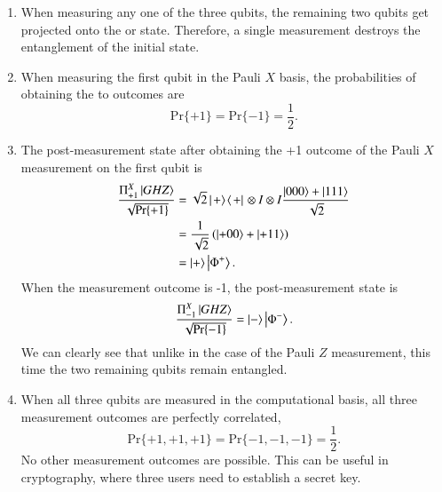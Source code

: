 \begin{solution}
\begin{enumerate}[label=(\alph*)]
    \item When measuring any one of the three qubits, the remaining two qubits get projected onto the  or  state. Therefore, a single measurement destroys the entanglement of the initial state.
    \item When measuring the first qubit in the Pauli $X$ basis, the probabilities of obtaining the to outcomes are
    \begin{equation*}
        \text{Pr}\{+1\} = \text{Pr}\{-1\} = \frac{1}{2}.
    \end{equation*}
    \item The post-measurement state after obtaining the +1 outcome of the Pauli $X$ measurement on the first qubit is
    \begin{align*}
        \frac{\Pi^X_{+1} \left| GHZ \right\rangle}{\sqrt{\text{Pr}\{+1\}}} & = \sqrt{2} \left|\left. + \rangle\right.\!\langle\left. + \right|\right. \otimes I\otimes I \frac{\left| 000 \right\rangle+\left| 111 \right\rangle}{\sqrt{2}} \\
        & = \frac{1}{\sqrt{2}} \left( \left| +00 \right\rangle + \left| +11 \right\rangle \right) \\
        & = \left| + \right\rangle\left| \Phi^+ \right\rangle. 
    \end{align*}
    When the measurement outcome is -1, the post-measurement state is
    \begin{equation*}
        \frac{\Pi^X_{-1} \left| GHZ \right\rangle}{\sqrt{\text{Pr}\{-1\}}} = \left| - \right\rangle\left| \Phi^- \right\rangle.
    \end{equation*}
    We can clearly see that unlike in the case of the Pauli $Z$ measurement, this time the two remaining qubits remain entangled.
    \item When all three qubits are measured in the computational basis, all three measurement outcomes are perfectly correlated,
    \begin{equation*}
        \text{Pr}\{+1,+1,+1\} = \text{Pr}\{-1,-1,-1\} = \frac{1}{2}.
    \end{equation*}
    No other measurement outcomes are possible.
    This can be useful in cryptography, where three users need to establish a secret key.
\end{enumerate}
\end{solution}

